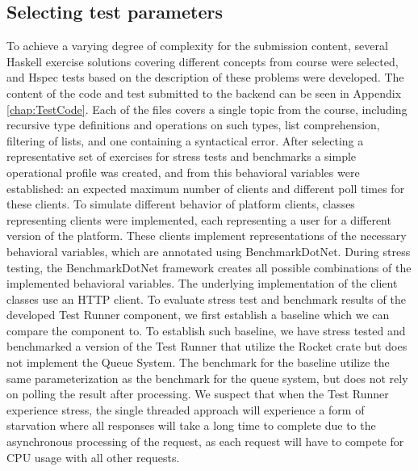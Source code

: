 \subsection{Selecting test parameters}
To achieve a varying degree of complexity for the submission content, several Haskell exercise solutions covering different concepts from course were selected, and Hspec tests based on the description of these problems were developed. 
The content of the code and test submitted to the backend can be seen in Appendix \ref{chap:TestCode}.
Each of the files covers a single topic from the course, including recursive type definitions and operations on such types, list comprehension, filtering of lists, and one containing a syntactical error.
After selecting a representative set of exercises for stress tests and benchmarks a simple operational profile was created, and from this behavioral variables were established: an expected maximum number of clients and different poll times for these clients.
To simulate different behavior of platform clients, classes representing clients were implemented, each representing a user for a different version of the platform.
These clients implement representations of the necessary behavioral variables, which are annotated using BenchmarkDotNet.
During stress testing, the BenchmarkDotNet framework creates all possible combinations of the implemented behavioral variables.
The underlying implementation of the client classes use an HTTP client.
To evaluate stress test and benchmark results of the developed Test Runner component, we first establish a baseline which we can compare the component to. 
To establish such baseline, we have stress tested and benchmarked a version of the Test Runner that utilize the Rocket crate but does not implement the Queue System. 
The benchmark for the baseline utilize the same parameterization as the benchmark for the queue system, but does not rely on polling the result after processing. 
We suspect that when the Test Runner experience stress, the single threaded approach will experience a form of starvation where all responses will take a long time to complete due to the asynchronous processing of the request, as each request will have to compete for CPU usage with all other requests.

